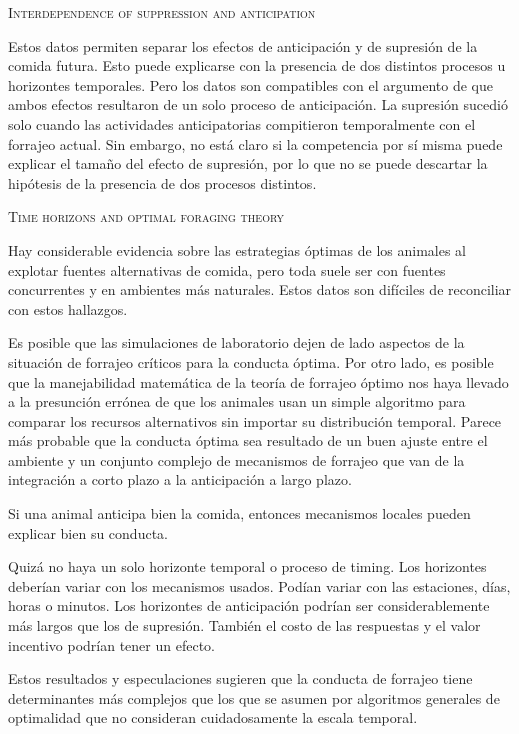 \documentclass[a4paper,12pt]{article}
\begin{document}
{\scshape Interdependence of suppression and anticipation}

Estos datos permiten separar los efectos de anticipación y de supresión de la comida futura. Esto puede explicarse con la presencia de dos distintos procesos u horizontes temporales. Pero los datos son compatibles con el argumento de que ambos efectos resultaron de un solo proceso de anticipación. La supresión sucedió solo cuando las actividades anticipatorias compitieron temporalmente con el forrajeo actual. Sin embargo, no está claro si la competencia por sí misma puede explicar el tamaño del efecto de supresión, por lo que no se puede descartar la hipótesis de la presencia de dos procesos distintos.

{\scshape Time horizons and optimal foraging theory}

Hay considerable evidencia sobre las estrategias óptimas de los animales al explotar fuentes alternativas de comida, pero toda suele ser con fuentes concurrentes y en ambientes más naturales. Estos datos son difíciles de reconciliar con estos hallazgos.

Es posible que las simulaciones de laboratorio dejen de lado aspectos de la situación de forrajeo críticos para la conducta óptima. Por otro lado, es posible que la manejabilidad matemática de la teoría de forrajeo óptimo nos haya llevado a la presunción errónea de que los animales usan un simple algoritmo para comparar los recursos alternativos sin importar su distribución temporal. Parece más probable que la conducta óptima sea resultado de un buen ajuste entre el ambiente y un conjunto complejo de mecanismos de forrajeo que van de la integración a corto plazo a la anticipación a largo plazo.

Si una animal anticipa bien la comida, entonces mecanismos locales pueden explicar bien su conducta.

Quizá no haya un solo horizonte temporal o proceso de timing. Los horizontes deberían variar con los mecanismos usados. Podían variar con las estaciones, días, horas o minutos. Los horizontes de anticipación podrían ser considerablemente más largos que los de supresión. También el costo de las respuestas y el valor incentivo podrían tener un efecto.

Estos resultados y especulaciones sugieren que la conducta de forrajeo tiene determinantes más complejos que los que se asumen por algoritmos generales de optimalidad que no consideran cuidadosamente la escala temporal.
\end{document}
